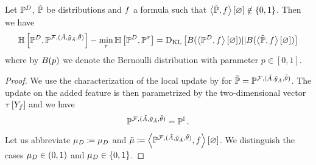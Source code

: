 \begin{lemma}
    Let $\mathbb{P}^{D}$, $\tilde{\mathbb{P}}$ be distributions and $f$ a formula such that $\left\langle \tilde{\mathbb{P}},f\right\rangle \left[ \varnothing \right]\notin\{0,1\}$.
    Then we have
    \begin{align*}
        \mathbb{H}\left[\mathbb{P}^{D},\mathbb{P}^{\mathcal{F},(\tilde{A},\tilde{y}_{\tilde{A}},\tilde{\theta})}\right]
        - \min_{\tau} \mathbb{H}\left[\mathbb{P}^{D},\mathbb{P}^{\tau}\right]
        = \mathrm{D}_{\mathrm{KL}}\left[ B(\left\langle \mathbb{P}^{D},f\right\rangle \left[ \varnothing \right]) || B(\left\langle \tilde{\mathbb{P}},f\right\rangle \left[ \varnothing \right]) \right]
    \end{align*}
    where by $B(p)$ we denote the Bernoulli distribution with parameter $p\in[0,1]$.
\end{lemma}
\begin{proof}
    We use the characterization of the local update by  for $\tilde{\mathbb{P}}=\mathbb{P}^{\mathcal{F},(\tilde{A},\tilde{y}_{\tilde{A}},\tilde{\theta})}$.
    The update on the added feature is then parametrized by the two-dimensional vector $\tau\left[Y_{f}\right]$ and we have
    \begin{align*}
        \mathbb{P}^{\mathcal{F},(\tilde{A},\tilde{y}_{\tilde{A}},\tilde{\theta})} = \mathbb{P}^{\mathbb{I}} \, .
    \end{align*}
    Let us abbreviate $\mu_{D}\coloneqq\mu_{D}$ and $\tilde{\mu}\coloneqq\left\langle \mathbb{P}^{\mathcal{F},(\tilde{A},\tilde{y}_{\tilde{A}},\tilde{\theta})},f\right\rangle \left[ \varnothing \right]$.
    We distinguish the cases $\mu_{D}\in(0,1)$ and $\mu_{D}\in\{0,1\}$.


\end{proof}
